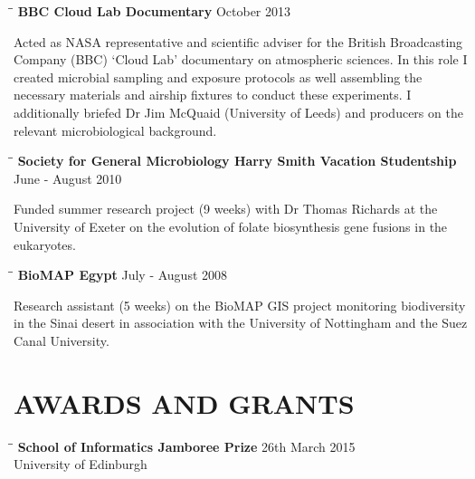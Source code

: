 \documentclass{res}
\begin{document}
\begin{resume}
     \vspace{-0.1in}
   \begin{tabbing}
   \hspace{2in}\= \hspace{2.6in}\= \kill 
    {\bf BBC Cloud Lab Documentary} \> \>        October 2013\\
     \end{tabbing}\vspace{-20pt}      
     Acted as NASA representative and scientific adviser for the British Broadcasting Company (BBC) `Cloud Lab' documentary on atmospheric sciences. In this role I created microbial sampling and exposure protocols as well assembling the necessary materials and airship fixtures to conduct these experiments. I additionally briefed Dr Jim McQuaid (University of Leeds) and producers on the relevant microbiological background. 

   \vspace{-0.1in}
      \begin{tabbing}
   \hspace{2in}\= \hspace{2.6in}\= \kill 
    {\bf Society for General Microbiology Harry Smith Vacation Studentship} \> \>        June - August 2010\\
     \end{tabbing}\vspace{-20pt}      
     Funded summer research project (9 weeks) with Dr Thomas Richards at the University of Exeter on the evolution of folate biosynthesis gene fusions in the eukaryotes.

\vspace{-0.1in}
   \begin{tabbing}
   \hspace{2in}\= \hspace{2.6in}\= \kill 
    {\bf BioMAP Egypt} \> \>        July - August 2008\\
     \end{tabbing}\vspace{-20pt}      
     Research assistant (5 weeks) on the BioMAP GIS project monitoring biodiversity in the Sinai desert in association with the University of Nottingham and the Suez Canal University.

\section{AWARDS AND GRANTS}

  \begin{tabbing}
   \hspace{2in}\= \hspace{2.6in}\= \kill 
    {\bf School of Informatics Jamboree Prize} \> \> 26th March 2015\\
                            \> 
                            \> University of Edinburgh\\


\end{tabbing}
\end{resume}
\end{document}
